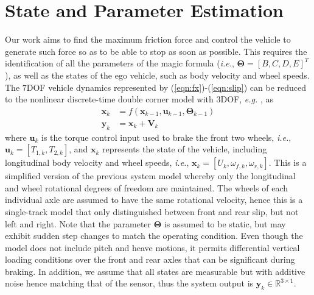 \documentclass[onecolumn,journal,draftclsnofoot]{IEEEtran}
\begin{document}
\section{State and Parameter Estimation}\label{stateparamest}
Our work aims to find the maximum friction force and control the vehicle to generate such force so as to be able to stop as soon as possible.
This requires the identification of all the parameters of the magic formula (\emph{i.e.}, $\mathbf{\Theta}=[B, C, D, E]^T$), as well as the states of the ego vehicle, such as body velocity and wheel speeds. 
The \(7\)DOF vehicle dynamics represented by (\ref{eqn:fx})-(\ref{eqn:slip}) can be reduced to the nonlinear discrete-time double corner model with 3DOF, \emph{e.g.} \cite{Savaresi2010a}, as
\begin{equation} \label{eqn:sysmod}
\begin{aligned}
    \mathbf{x}_{k} & = f\left(\mathbf{x}_{k-1},{\mathbf{u}}_{k-1},\mathbf{\Theta}_{k-1} \right) \\  
    \mathbf{y}_{k} &= \mathbf{x}_{k} + \mathbf{V}_{k}
\end{aligned}
\end{equation}
where \(\mathbf{u}_k\) is the torque control input used to brake the front two wheels, \emph{i.e.}, \(\mathbf{u}_k=\left[T_{1,k},T_{2,k}\right]\), and $\mathbf{x}_k$ represents the state of the vehicle, including longitudinal body velocity and wheel speeds, \emph{i.e.}, \(\mathbf{x}_k = \left[ U_k,\omega_{f,k},\omega_{r,k} \right]\).
This is a simplified version of the previous system model whereby only the longitudinal and wheel rotational degrees of freedom are maintained. 
The wheels of each individual axle are assumed to have the same rotational velocity, hence this is a single-track model that only distinguished between front and rear slip, but not left and right.
Note that the parameter $\mathbf{\Theta}$ is assumed to be static, but may exhibit sudden step changes to match the operating condition. 
Even though the model does not include pitch and heave motions, it permits differential vertical loading conditions over the front and rear axles that can be significant during braking. 
In addition, we assume that all states are measurable but with additive noise hence matching that of the sensor, thus the system output is \(\mathbf{y}_{k} \in \mathbb{R}^{3 \times 1}\).
\end{document}
